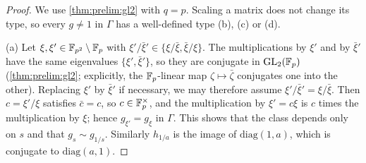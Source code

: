\begin{proof}
We use \cref{thm:prelim:gl2} with $q=p$. Scaling a matrix does not change its
type, so every $g\ne1$ in $\Gamma$ has a well-defined type (b), (c) or (d).

(a) Let $\xi,\xi'\in\mathbb F_{p^2}\setminus\mathbb F_p$ with
$\xi'/\bar\xi'\in\{\xi/\bar\xi,\bar\xi/\xi\}$. The multiplications by $\xi'$
and by $\bar\xi'$ have the same eigenvalues $\{\xi',\bar\xi'\}$, so they are
conjugate in $\mathrm{GL}_2(\mathbb F_p)$ (\cref{thm:prelim:gl2}; explicitly, the
$\mathbb F_p$-linear map $\zeta\mapsto\bar\zeta$ conjugates one into the other).
Replacing $\xi'$ by $\bar\xi'$ if necessary, we may therefore assume
$\xi'/\bar\xi'=\xi/\bar\xi$. Then $c=\xi'/\xi$ satisfies $\bar c=c$, so
$c\in\mathbb F_p^\times$, and the multiplication by $\xi'=c\xi$ is $c$ times the
multiplication by $\xi$; hence $g_{\xi'}=g_\xi$ in $\Gamma$. This shows that
the class depends only on $s$ and that $g_s\sim g_{1/s}$. Similarly $h_{1/a}$
is the image of $\mathrm{diag}(1,a)$, which is conjugate to $\mathrm{diag}(a,1)$.


\end{proof}
